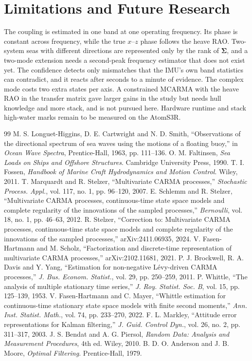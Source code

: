 \documentclass[conference]{IEEEtran}
\DeclareRobustCommand{\mat}[1]{\bm{#1}}
\theoremstyle{bodysmall}
\begin{document}
\section{Limitations and Future Research}
The coupling is estimated in one band at one operating frequency. Its phase
is constant across frequency, while the true $x$--$z$ phase follows the heave
RAO. Two-system seas with different directions are represented only by the
rank of $\mat\Sigma$, and a two-mode extension needs a second-peak frequency
estimator that does not exist yet. The confidence detects only mismatches
that the IMU's own band statistics can contradict, and it reacts after
seconds to a minute of evidence. The complex mode costs two extra states per
axis. A constrained MCARMA with the heave RAO in the transfer matrix gave
larger gains in the study but needs hull knowledge and more stack, and is not
pursued here. Hardware runtime and stack high-water marks remain to be
measured on the AtomS3R.

\begin{thebibliography}{99}
M. S. Longuet-Higgins, D. E. Cartwright and N. D. Smith, ``Observations of
the directional spectrum of sea waves using the motions of a floating buoy,''
in \emph{Ocean Wave Spectra}, Prentice-Hall, 1963, pp. 111--136.
O. M. Faltinsen, \emph{Sea Loads on Ships and Offshore Structures}.
Cambridge University Press, 1990.
T. I. Fossen, \emph{Handbook of Marine Craft Hydrodynamics and Motion
Control}. Wiley, 2011.
T. Marquardt and R. Stelzer, ``Multivariate CARMA processes,''
\emph{Stochastic Process. Appl.}, vol. 117, no. 1, pp. 96--120, 2007.
E. Schlemm and R. Stelzer, ``Multivariate CARMA processes, continuous-time
state space models and complete regularity of the innovations of the sampled
processes,'' \emph{Bernoulli}, vol. 18, no. 1, pp. 46--63, 2012.
R. Stelzer, ``Correction to: Multivariate CARMA processes, continuous-time
state space models and complete regularity of the innovations of the sampled
processes,'' arXiv:2411.06935, 2024.
V. Fasen-Hartmann and M. Scholz, ``Factorization and discrete-time
representation of multivariate CARMA processes,'' arXiv:2102.11681, 2021.
P. J. Brockwell, R. A. Davis and Y. Yang, ``Estimation for non-negative
L\'evy-driven CARMA processes,'' \emph{J. Bus. Econom. Statist.}, vol. 29,
pp. 250--259, 2011.
P. Whittle, ``The analysis of multiple stationary time series,'' \emph{J.
Roy. Statist. Soc. B}, vol. 15, pp. 125--139, 1953.
V. Fasen-Hartmann and C. Mayer, ``Whittle estimation for continuous-time
stationary state space models with finite second moments,'' \emph{Ann. Inst.
Statist. Math.}, vol. 74, pp. 233--270, 2022.
F. L. Markley, ``Attitude error representations for Kalman filtering,''
\emph{J. Guid. Control Dyn.}, vol. 26, no. 2, pp. 311--317, 2003.
J. S. Bendat and A. G. Piersol, \emph{Random Data: Analysis and Measurement
Procedures}, 4th ed. Wiley, 2010.
B. D. O. Anderson and J. B. Moore, \emph{Optimal Filtering}. Prentice-Hall,
1979.
\end{thebibliography}
\end{document}
